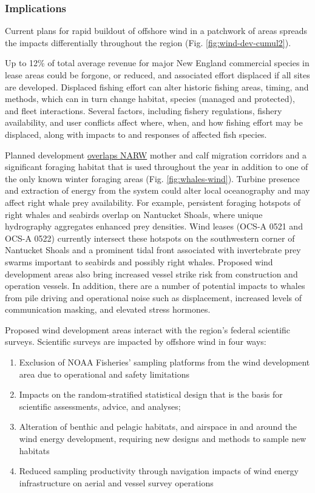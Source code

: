 \documentclass[
  10pt,
]{article}
\providecommand{\tightlist}{%
  \setlength{\itemsep}{0pt}\setlength{\parskip}{0pt}}
\begin{document}
\hypertarget{implications-6}{%
\subsubsection{Implications}\label{implications-6}}

Current plans for rapid buildout of offshore wind in a patchwork of areas spreads the impacts differentially throughout the region (Fig. \ref{fig:wind-dev-cumul2}).

Up to 12\% of total average revenue for major New England commercial species in lease areas could be forgone, or reduced, and associated effort displaced if all sites are developed. Displaced fishing effort can alter historic fishing areas, timing, and methods, which can in turn change habitat, species (managed and protected), and fleet interactions. Several factors, including fishery regulations, fishery availability, and user conflicts affect where, when, and how fishing effort may be displaced, along with impacts to and responses of affected fish species.

Planned development \href{https://noaa-edab.github.io/catalog/right-whale-abundance.html}{overlaps NARW} mother and calf migration corridors and a significant foraging habitat that is used throughout the year in addition to one of the only known winter foraging areas (Fig. \ref{fig:whales-wind}). Turbine presence and extraction of energy from the system could alter local oceanography and may affect right whale prey availability. For example, persistent foraging hotspots of right whales and seabirds overlap on Nantucket Shoals, where unique hydrography aggregates enhanced prey densities. Wind leases (OCS-A 0521 and OCS-A 0522) currently intersect these hotspots on the southwestern corner of Nantucket Shoals and a prominent tidal front associated with invertebrate prey swarms important to seabirds and possibly right whales. Proposed wind development areas also bring increased vessel strike risk from construction and operation vessels. In addition, there are a number of potential impacts to whales from pile driving and operational noise such as displacement, increased levels of communication masking, and elevated stress hormones.

Proposed wind development areas interact with the region's federal scientific surveys. Scientific surveys are impacted by offshore wind in four ways:

\begin{enumerate}
\def\labelenumi{\arabic{enumi}.}
\tightlist
\item
  Exclusion of NOAA Fisheries' sampling platforms from the wind development area due to operational and safety limitations
\item
  Impacts on the random-stratified statistical design that is the basis for scientific assessments, advice, and analyses;
\item
  Alteration of benthic and pelagic habitats, and airspace in and around the wind energy development, requiring new designs and methods to sample new habitats
\item
  Reduced sampling productivity through navigation impacts of wind energy infrastructure on aerial and vessel survey operations
\end{enumerate}
\end{document}
